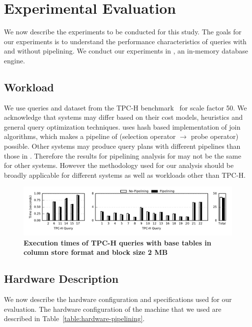 \section{Experimental Evaluation}\label{sec:experiments}
We now describe the experiments to be conducted for this study.
The goals for our experiments is to understand the performance characteristics of queries with and without pipelining. 
We conduct our experiments in \sys{}, an in-memory database engine. 

\subsection{Workload}
We use queries and dataset from the TPC-H benchmark~\cite{tpc-h} for scale factor 50.
We acknowledge that systems may differ based on their cost models, heuristics and general query optimization techniques.
\sys{} uses hash based implementation of join algorithms, which makes a pipeline of (selection operator $\rightarrow$ probe operator) possible. 
Other systems may produce query plans with different pipelines than those in \sys{}. 
Therefore the results for pipelining analysis for \sys{} may not be the same for other systems.
However the methodology used for our analysis should be broadly applicable for different systems as well as workloads other than TPC-H. 

\begin{figure}[ht]
	\centering 
	\includegraphics{pipeline/figures/colstore-20threads-bs2mb-withlip-alltpch}
	\caption{\textbf{Execution times of TPC-H queries with base tables in column store format and block size 2 MB}}
	\label{fig:absolute-times-all-tpch-bs2mb-20threads}
\end{figure}

\subsection{Hardware Description}\label{ssec:hardware-description}
We now describe the hardware configuration and \sys{} specifications used for our evaluation. 
The hardware configuration of the machine that we used are described in Table~\ref{table:hardware-pipelining}.

